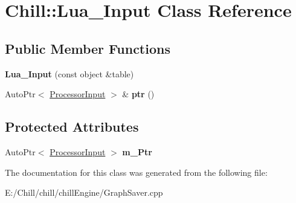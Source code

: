 \hypertarget{class_chill_1_1_lua___input}{}\section{Chill\+:\+:Lua\+\_\+\+Input Class Reference}
\label{class_chill_1_1_lua___input}
\subsection*{Public Member Functions}
\begin{DoxyCompactItemize}
\item 
\mbox{\label{class_chill_1_1_lua___input_aebbfcc46776a36fd960ee0bf974342c0}} 
{\bfseries Lua\+\_\+\+Input} (const object \&table)
\item 
\mbox{\label{class_chill_1_1_lua___input_a36deda5e1529c5e8cc5e3de94b0f900a}} 
Auto\+Ptr$<$ \mbox{\hyperlink{class_chill_1_1_processor_input}{Processor\+Input}} $>$ \& {\bfseries ptr} ()
\end{DoxyCompactItemize}
\subsection*{Protected Attributes}
\begin{DoxyCompactItemize}
\item 
\mbox{\label{class_chill_1_1_lua___input_a42c13f028f1a8eb593eee9537e932493}} 
Auto\+Ptr$<$ \mbox{\hyperlink{class_chill_1_1_processor_input}{Processor\+Input}} $>$ {\bfseries m\+\_\+\+Ptr}
\end{DoxyCompactItemize}


The documentation for this class was generated from the following file\+:\begin{DoxyCompactItemize}
\item 
E\+:/\+Chill/chill/chill\+Engine/Graph\+Saver.\+cpp\end{DoxyCompactItemize}
